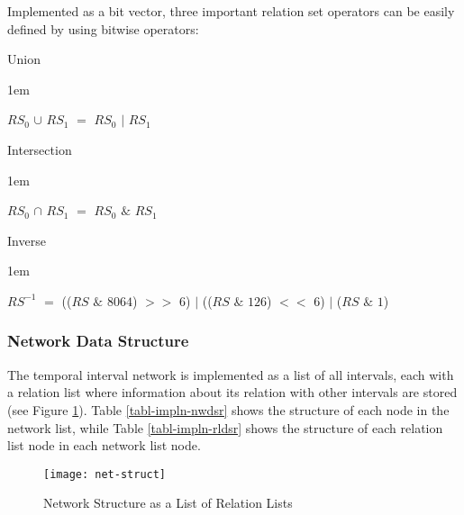 \documentclass[11pt]{report}
\newenvironment{vquote}
{
  \begin{list}{}{\leftmargin 1em}\item[]
}
{
  \end{list}
}
\begin{document}
          Implemented as a bit vector, three important relation set operators
          can be easily defined by using bitwise operators:

          \begin{itemize}
            \item
              Union
              \begin{vquote}
                $RS_0$ $\cup$ $RS_1$ $=$ $RS_0$ $|$ $RS_1$
              \end{vquote}

            \item
              Intersection
              \begin{vquote}
                $RS_0$ $\cap$ $RS_1$ $=$ $RS_0$ $\&$ $RS_1$
              \end{vquote}

            \item
              Inverse

              \begin{vquote}
                $RS^{-1}$ $=$
                  (($RS$ $\&$ $8064$) $>>$ $6$) $|$
                  (($RS$ $\&$ $126$)  $<<$ $6$) $|$
                  ($RS$ $\&$ $1$)
              \end{vquote}
          \end{itemize}

        \subsubsection{Network Data Structure}

          The temporal interval network is implemented as a list of all
          intervals, each with a relation list where information about its
          relation with other intervals are stored (see Figure
          \ref{figu-impln-nwstr}). Table \ref{tabl-impln-nwdsr} shows the
          structure of each node in the network list, while Table
          \ref{tabl-impln-rldsr} shows the structure of each relation list
          node in each network list node.

          \begin{figure}[tbhp]
            \begin{center}
              \texttt{[image: net-struct]}
              \caption{Network Structure as a List of Relation Lists}
              \label{figu-impln-nwstr}
            \end{center}
          \end{figure}
\end{document}
